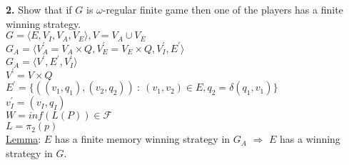\noindent
\textbf{2.}
Show that if $G$ is $\omega$-regular finite game then one of the players has a finite winning strategy.\\

\noindent
$G = \langle E, V_I, V_A, V_E \rangle, V = V_A \cup V_E$\\
$G_A = \langle V_A^\prime = V_A \times Q, V_E^\prime = V_E \times Q, V_I^\prime, E^\prime \rangle$\\
$G_A = \langle V^\prime, E^\prime, V_I^\prime \rangle$\\
$V^\prime = V \times Q$\\
$E^\prime = \{((v_1, q_1), (v_2, q_2))\ :\ (v_1, v_2) \in E, q_2 = \delta(q_1, v_1)\}$\\
$v_I^\prime = (v_I, q_I)$\\
$W = inf(L(P)) \in \mathcal{F}$\\
$L = \pi_2(p)$\\
\underline{Lemma}: $E$ has a finite memory winning strategy in $G_A$ $\Rightarrow$ $E$ has a
winning strategy in $G$.